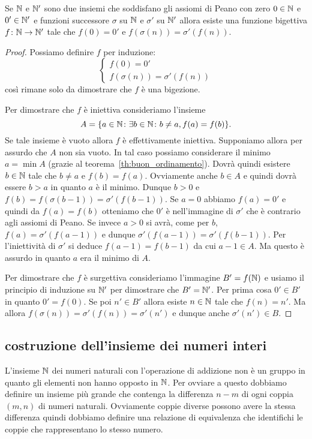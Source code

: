 \begin{theorem}
  \label{th:unicitaN}%
  Se ${\mathbb N}$ e ${\mathbb N}'$ sono due insiemi che soddisfano gli assiomi di Peano 
  con zero $0\in {\mathbb N}$ e $0'\in {\mathbb N}'$ e funzioni 
  successore $\sigma$ su ${\mathbb N}$ e $\sigma'$ su ${\mathbb N}'$ allora
  esiste una funzione bigettiva $f\colon {\mathbb N}\to {\mathbb N}'$ tale che 
  $f(0) = 0'$ e $f(\sigma(n)) = \sigma'(f(n))$.
\end{theorem}
%
\begin{proof}
Possiamo definire $f$ per induzione:
\[
\begin{cases}
  f(0) = 0' \\ 
  f(\sigma(n)) = \sigma'(f(n))
\end{cases}  
\]
così rimane solo da dimostrare che $f$ è una bigezione.

Per dimostrare che $f$ è iniettiva consideriamo l'insieme 
\[
  A={\left\{ a\in {\mathbb N}\colon \exists b\in {\mathbb N}\colon b\neq a, f(a)=f(b) \right\}}.
\]
Se tale insieme è vuoto allora $f$ è effettivamente iniettiva.
Supponiamo allora per assurdo che $A$ non sia vuoto.
In tal caso possiamo considerare il minimo $a=\min A$ 
(grazie al teorema~\ref{th:buon_ordinamento}).
Dovrà quindi esistere $b\in {\mathbb N}$ tale che $b\neq a$ e $f(b)=f(a)$.
Ovviamente anche $b\in A$ e quindi dovrà essere $b>a$ in quanto
$a$ è il minimo. Dunque $b>0$ e $f(b) = f(\sigma(b-1))
=\sigma'(f(b-1))$. Se $a=0$ abbiamo $f(a)=0'$ e quindi da $f(a)=f(b)$ 
otteniamo che $0'$ è nell'immagine di $\sigma'$ che è contrario 
agli assiomi di Peano. 
Se invece $a>0$ si avrà, come per $b$,
$f(a)=\sigma'(f(a-1))$ e dunque $\sigma'(f(a-1)) = \sigma'(f(b-1))$.
Per l'iniettività di $\sigma'$ si deduce $f(a-1)=f(b-1)$ da cui 
$a-1 \in A$. Ma questo è assurdo in quanto $a$ era il minimo di $A$.

Per dimostrare che $f$ è surgettiva consideriamo l'immagine 
$B'=f({\mathbb N})$ e usiamo il principio di induzione su ${\mathbb N}'$ 
per dimostrare che $B'={\mathbb N}'$.
Per prima cosa $0'\in B'$ in quanto $0'=f(0)$.
Se poi $n'\in B'$ allora esiste $n\in {\mathbb N}$ tale che $f(n)=n'$.
Ma allora $f(\sigma(n))=\sigma'(f(n))=\sigma'(n')$ 
e dunque anche $\sigma'(n')\in B$. 
\end{proof}

\subsection{costruzione dell'insieme dei numeri interi}

L'insieme ${\mathbb N}$ dei numeri naturali con l'operazione di addizione 
non è un gruppo in quanto gli elementi non hanno opposto in ${\mathbb N}$.
Per ovviare a questo dobbiamo definire un insieme più grande che 
contenga la differenza $n-m$ di ogni coppia $(m,n)$ di numeri naturali.
Ovviamente coppie diverse possono avere la stessa differenza quindi 
dobbiamo definire una relazione di equivalenza che identifichi le coppie 
che rappresentano lo stesso numero. 


